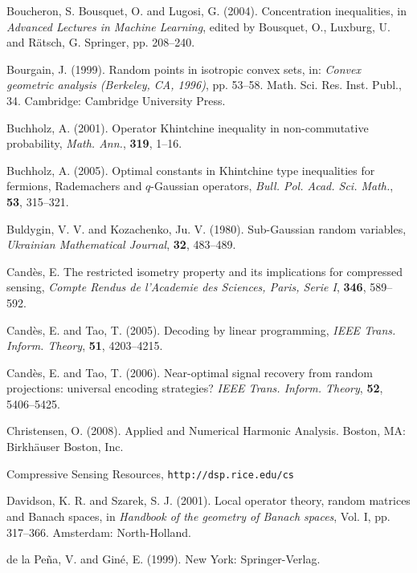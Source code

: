 \documentclass[10pt, openany]{book}
\theoremstyle{remark}
\begin{document}
\begin{thebibliography}{}
 Boucheron, S. Bousquet, O. and Lugosi, G. (2004).
  \newblock Concentration inequalities, 
  in {\em Advanced Lectures in Machine Learning}, edited by Bousquet, O., Luxburg, U. and R\"atsch, G. 
  Springer, pp. 208--240.
  
 Bourgain, J. (1999).
  \newblock Random points in isotropic convex sets,
  in: {\em Convex geometric analysis (Berkeley, CA, 1996)},  pp. 53--58. 
  Math. Sci. Res. Inst. Publ., 34.
  Cambridge: Cambridge University Press.

 Buchholz, A. (2001). 
  \newblock Operator Khintchine inequality in non-commutative probability,
  {\em Math. Ann.}, {\bf 319}, 1--16.
  
 Buchholz, A. (2005). 
  \newblock Optimal constants in Khintchine type inequalities for fermions, 
    Rademachers and $q$-Gaussian operators,
  {\em Bull. Pol. Acad. Sci. Math.}, {\bf 53}, 315--321.

 Buldygin, V. V. and Kozachenko, Ju. V. (1980).
  \newblock Sub-Gaussian random variables, 
  {\em Ukrainian Mathematical Journal}, {\bf 32}, 483--489.

 Cand\`es, E. 
  \newblock The restricted isometry property and its implications for compressed sensing, 
  {\em Compte Rendus de l'Academie des Sciences, Paris, Serie I}, {\bf 346}, 589--592.

 Cand\`es, E. and Tao, T. (2005).
  \newblock Decoding by linear programming, 
  {\em IEEE Trans. Inform. Theory}, {\bf 51}, 4203--4215.

 Cand\`es, E. and Tao, T. (2006).
  \newblock Near-optimal signal recovery from random projections: universal encoding strategies? 
  {\em IEEE Trans. Inform. Theory}, {\bf 52}, 5406--5425. 

 Christensen, O. (2008).
  Applied and Numerical Harmonic Analysis. 
  Boston, MA: Birkh\"auser Boston, Inc.

 Compressive Sensing Resources, 
  \verb=http://dsp.rice.edu/cs=

 Davidson, K. R. and Szarek, S. J. (2001).
  \newblock Local operator theory, random matrices and Banach spaces,
  in {\em Handbook of the geometry of Banach spaces}, Vol. I, pp. 317--366.
  Amsterdam: North-Holland.

 de la Pe\~na, V. and Gin\'e, E. (1999).
  New York: Springer-Verlag.
  

\end{thebibliography}
\end{document}
